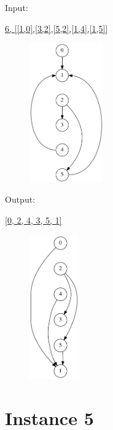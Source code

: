 \documentclass[10pt]{article}
\begin{document}
\squishlist
  \item \parbox{40pt}{Input:}  \url{6, [[1,0],[3,2],[5,2],[1,4],[1,5]]}
\squishend
\begin{figure}[h!]
  \hspace{50pt}
  \hspace{50pt}
  \hspace{50pt}
  \includegraphics[width=90pt]{Input/Graph_4b.gv.png}
\end{figure}

\squishlist
  \item \parbox{40pt}{Output:} \url{[0, 2, 4, 3, 5, 1]}
\squishend
\begin{figure}[h!]
  \hspace{50pt}
  \includegraphics[width=60pt]{Output/Graph_4_soln.gv.png}
\end{figure}


\newpage

\section*{Instance 5}
\end{document}
